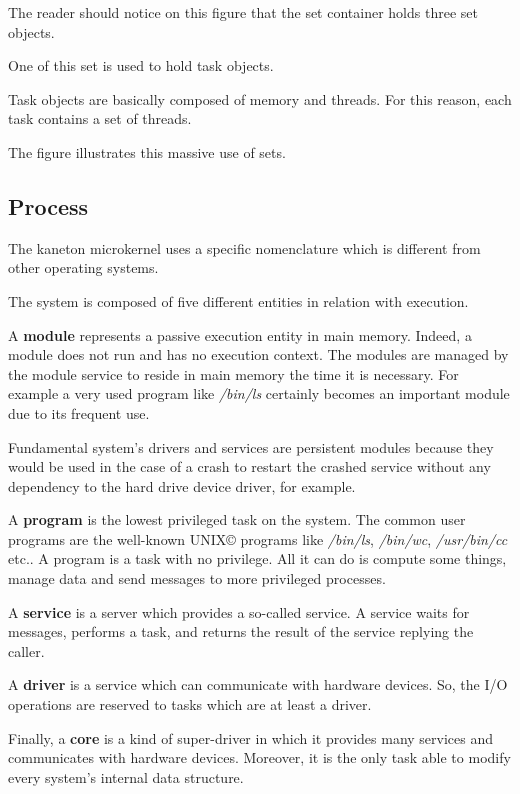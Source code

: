 \begin{multicols}{2}

The reader should notice on this figure that the set container holds
three set objects.

One of this set is used to hold task objects.

Task objects are basically composed of memory and threads. For this
reason, each task contains a set of threads.

The figure illustrates this massive use of sets.

%
%

\subsection{Process}

The kaneton microkernel uses a specific nomenclature which is different
from other operating systems.

The system is composed of five different entities in relation with execution.

A \textbf{module} represents a passive execution entity in main memory.
Indeed, a module does not run and has no execution context. The modules are
managed by the module service to reside in main memory the time it is
necessary. For example a very used program like \textit{/bin/ls} certainly
becomes an important module due to its frequent use.

Fundamental system's drivers and services are persistent modules because
they would be used in the case of a crash to restart the crashed service
without any dependency to the hard drive device driver, for example.

A \textbf{program} is the lowest privileged task on the system.
The common user programs are the well-known UNIX{\scriptsize \copyright}
programs like \textit{/bin/ls}, \textit{/bin/wc}, \textit{/usr/bin/cc} etc..
A program is a task with no privilege. All it can do is compute some things,
manage data and send messages to more privileged processes.

A \textbf{service} is a server which provides a so-called service. A service
waits for messages, performs a task, and returns the result of the service
replying the caller.

A \textbf{driver} is a service which can communicate with hardware devices.
So, the I/O operations are reserved to tasks which are at least a driver.

Finally, a \textbf{core} is a kind of super-driver in which it provides
many services and communicates with hardware devices. Moreover, it is
the only task able to modify every system's internal data structure.


\end{multicols}
